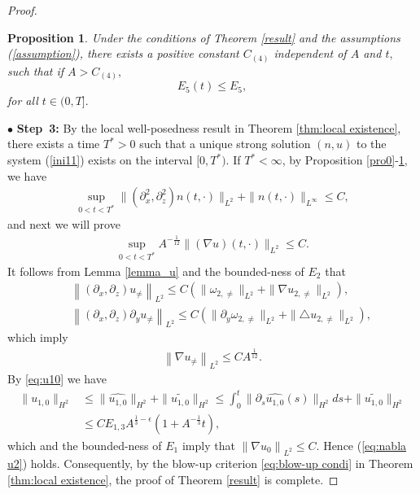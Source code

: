 \documentclass[12pt, reqno]{amsart}
\newtheorem{proposition}{Proposition}[section]
\newcommand{\ben}{\begin{eqnarray}}
\newcommand{\een}{\end{eqnarray}}
\newcommand{\beno}{\begin{eqnarray*}}
\newcommand{\eeno}{\end{eqnarray*}}
\numberwithin{equation}{section}
\begin{document}
\begin{proof}
	\begin{proposition}{}\label{pro4}
		Under the conditions of  Theorem \ref{result} and  the assumptions (\ref{assumption}),
		there exists a positive constant $C_{(4)}$ independent of $A$ and $t,$
		such that if $A>C_{(4)},$
		$$E_5(t)\leq E_5,$$
		for all $t\in(0,T].$
	\end{proposition}
	
	$\bullet$ \textbf{Step~3:} 
By the local well-posedness result in Theorem \ref{thm:local existence},
	 there exists a time $T^*>0$ such that a unique strong solution $(n,u)$ to the system {\rm (\ref{ini11})} exists on the interval $[0,T^*).$ If $T^*<\infty$, by Proposition \ref{pro0}-\ref{pro4}, we have
\beno\label{eq:blow-up condi'}
\sup_{0<t< T^*}
	\|(\partial_{x}^{2},\partial_{z}^{2})n(t,\cdot)\|_{L^{2}}+\|n(t,\cdot)\|_{L^{\infty}}\leq C,
\eeno
and next we will prove 
\ben\label{eq:nabla u2}\sup_{0<t< T^*}A^{-\frac{1}{12}}\|(\nabla u)(t,\cdot)\|_{L^{2}}\leq C.
\een
It follows from Lemma \ref{lemma_u} and the bounded-ness of $E_2$ that
\beno&&\left\|(\partial_x,
				\partial_z)u_{\neq}\right\|_{L^2}\leq C(\|\omega_{2,\neq}\|_{L^2}
				+\|\nabla u_{2,\neq}\|_{L^2}),\\
&&
\left\|(\partial_x,
				\partial_z)\partial_yu_{\neq}\right\|_{L^2}\leq C(\|\partial_y\omega_{2,\neq}\|_{L^2}
				+\|\triangle u_{2,\neq}\|_{L^2}),
\eeno
which imply 
\beno
\left\|\nabla u_{\neq}\right\|_{L^2}\leq C A^{\frac{1}{12}}.
\eeno
By \eqref{eq:u10} we have
\beno\label{eq:u10}
				\|{u_{1,0}}\|_{H^2}
				&\leq \|\widehat{u_{1,0}}\|_{H^2}+\|\widetilde{u_{1,0}}\|_{H^2}\leq \int_0^t \|\partial_s\widehat{u_{1,0}}(s)\|_{H^2}ds
				+\|\widetilde{u_{1,0}}\|_{H^2}\nonumber\\
				&\leq CE_{1,3}A^{\frac13-\epsilon}(1+A^{-\frac13}t),
			\eeno
which and the bounded-ness of $E_1$ imply that $\left\|\nabla u_{0}\right\|_{L^2}\leq C.$ Hence (\ref{eq:nabla u2}) holds.
Consequently, by the blow-up criterion \eqref{eq:blow-up condi} in Theorem \ref{thm:local existence}, the proof of Theorem \ref{result} is complete. \end{proof}
\end{document}
